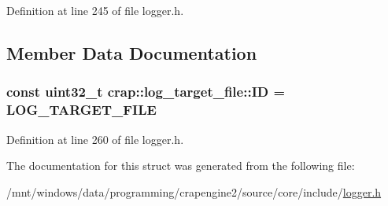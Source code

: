Definition at line 245 of file logger.\+h.



\subsection{Member Data Documentation}
\hypertarget{structcrap_1_1log__target__file_acf3fecd666f8318bbd09d33ca0531803}{}
\subsubsection[{I\+D}]{\setlength{\rightskip}{0pt plus 5cm}const uint32\+\_\+t crap\+::log\+\_\+target\+\_\+file\+::\+I\+D = {\bf L\+O\+G\+\_\+\+T\+A\+R\+G\+E\+T\+\_\+\+F\+I\+L\+E}\hspace{0.3cm}{\ttfamily [static]}}\label{structcrap_1_1log__target__file_acf3fecd666f8318bbd09d33ca0531803}


Definition at line 260 of file logger.\+h.



The documentation for this struct was generated from the following file\+:\begin{DoxyCompactItemize}
\item 
/mnt/windows/data/programming/crapengine2/source/core/include/\hyperlink{logger_8h}{logger.\+h}\end{DoxyCompactItemize}
